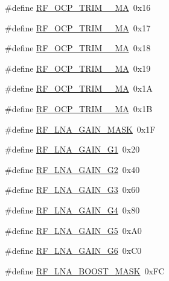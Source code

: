 \begin{DoxyCompactItemize}
\item 
\#define \mbox{\hyperlink{sx1276_regs-_fsk_8h_a80d19cc2e70d7f878ee824f9ce0b0b8b}{R\+F\+\_\+\+O\+C\+P\+\_\+\+T\+R\+I\+M\+\_\+\_\+\+MA}}~0x16
\item 
\#define \mbox{\hyperlink{sx1276_regs-_fsk_8h_a5b9812e1a3678664f64af0c4bf22cf96}{R\+F\+\_\+\+O\+C\+P\+\_\+\+T\+R\+I\+M\+\_\+\_\+\+MA}}~0x17
\item 
\#define \mbox{\hyperlink{sx1276_regs-_fsk_8h_a03e5de0e6f345d7c6f813fe49a2f3a8d}{R\+F\+\_\+\+O\+C\+P\+\_\+\+T\+R\+I\+M\+\_\+\_\+\+MA}}~0x18
\item 
\#define \mbox{\hyperlink{sx1276_regs-_fsk_8h_a5857beccb0e3c2c875d33b7644ae7849}{R\+F\+\_\+\+O\+C\+P\+\_\+\+T\+R\+I\+M\+\_\+\_\+\+MA}}~0x19
\item 
\#define \mbox{\hyperlink{sx1276_regs-_fsk_8h_a87f10f8656ea5d103c7f4df386d1c8b6}{R\+F\+\_\+\+O\+C\+P\+\_\+\+T\+R\+I\+M\+\_\+\_\+\+MA}}~0x1A
\item 
\#define \mbox{\hyperlink{sx1276_regs-_fsk_8h_a26aa5a089e0f570046a41643fa416dce}{R\+F\+\_\+\+O\+C\+P\+\_\+\+T\+R\+I\+M\+\_\+\_\+\+MA}}~0x1B
\item 
\#define \mbox{\hyperlink{sx1276_regs-_fsk_8h_aecfcf32d325020275e659f18f096593a}{R\+F\+\_\+\+L\+N\+A\+\_\+\+G\+A\+I\+N\+\_\+\+M\+A\+SK}}~0x1F
\item 
\#define \mbox{\hyperlink{sx1276_regs-_fsk_8h_a64189fbd3e263a0cd23c565f1cda656e}{R\+F\+\_\+\+L\+N\+A\+\_\+\+G\+A\+I\+N\+\_\+\+G1}}~0x20
\item 
\#define \mbox{\hyperlink{sx1276_regs-_fsk_8h_a5db88ff1f5dcbf3e2e73aa95b7b9e395}{R\+F\+\_\+\+L\+N\+A\+\_\+\+G\+A\+I\+N\+\_\+\+G2}}~0x40
\item 
\#define \mbox{\hyperlink{sx1276_regs-_fsk_8h_a27cb701834892c250a7859261e26d7da}{R\+F\+\_\+\+L\+N\+A\+\_\+\+G\+A\+I\+N\+\_\+\+G3}}~0x60
\item 
\#define \mbox{\hyperlink{sx1276_regs-_fsk_8h_a313f47fe3c3dc5879cfdfa74ecebd9db}{R\+F\+\_\+\+L\+N\+A\+\_\+\+G\+A\+I\+N\+\_\+\+G4}}~0x80
\item 
\#define \mbox{\hyperlink{sx1276_regs-_fsk_8h_ab2fcc04cefd1433048655c2b49e95204}{R\+F\+\_\+\+L\+N\+A\+\_\+\+G\+A\+I\+N\+\_\+\+G5}}~0x\+A0
\item 
\#define \mbox{\hyperlink{sx1276_regs-_fsk_8h_a33e9322adb51544aa391dc909ab83516}{R\+F\+\_\+\+L\+N\+A\+\_\+\+G\+A\+I\+N\+\_\+\+G6}}~0x\+C0
\item 
\#define \mbox{\hyperlink{sx1276_regs-_fsk_8h_a00faa959b2d9cdedea58962da0579c96}{R\+F\+\_\+\+L\+N\+A\+\_\+\+B\+O\+O\+S\+T\+\_\+\+M\+A\+SK}}~0x\+FC

\end{DoxyCompactItemize}
